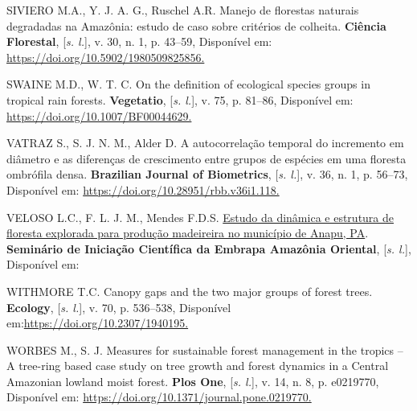 \documentclass[
]{article}
\newlength{\cslhangindent}
\newlength{\cslentryspacingunit} %
\newenvironment{CSLReferences}[2] %
 {%
  \setlength{\parindent}{0pt}
  \ifodd #1
  \let\oldpar\par
  \def\par{\hangindent=\cslhangindent\oldpar}
  \fi
  \setlength{\parskip}{#2\cslentryspacingunit}
 }%
 {}
\begin{document}
\begin{CSLReferences}{0}{1}
\leavevmode{}%
SIVIERO M.A., Y. J. A. G., Ruschel A.R. Manejo de florestas naturais
degradadas na Amazônia: estudo de caso sobre critérios de colheita.
\textbf{Ciência Florestal}, {[}\emph{s. l.}{]}, v. 30, n. 1, p. 43--59,
Disponível em:
\href{https://doi.org/10.5902/1980509825856}{https://doi.org/10.5902/1980509825856.
}

\leavevmode{}%
SWAINE M.D., W. T. C. On the definition of ecological species groups in
tropical rain forests. \textbf{Vegetatio}, {[}\emph{s. l.}{]}, v. 75, p.
81--86, Disponível em:
\href{https://doi.org/10.1007/BF00044629}{https://doi.org/10.1007/BF00044629.
}

\leavevmode{}%
VATRAZ S., S. J. N. M., Alder D. A autocorrelação temporal do incremento
em diâmetro e as diferenças de crescimento entre grupos de espécies em
uma floresta ombrófila densa. \textbf{Brazilian Journal of Biometrics},
{[}\emph{s. l.}{]}, v. 36, n. 1, p. 56--73, Disponível em:
\href{https://doi.org/10.28951/rbb.v36i1.118}{https://doi.org/10.28951/rbb.v36i1.118.
}

\leavevmode{}%
VELOSO L.C., F. L. J. M., Mendes F.D.S. \href{}{Estudo da dinâmica e
estrutura de floresta explorada para produção madeireira no município de
Anapu, PA}. \textbf{Seminário de Iniciação Científica da Embrapa
Amazônia Oriental}, {[}\emph{s. l.}{]}, Disponível em:

\leavevmode{}%
WITHMORE T.C. Canopy gaps and the two major groups of forest trees.
\textbf{Ecology}, {[}\emph{s. l.}{]}, v. 70, p. 536--538, Disponível
em:\href{\%20https://doi.org/10.2307/1940195}{https://doi.org/10.2307/1940195.
}

\leavevmode{}%
WORBES M., S. J. Measures for sustainable forest management in the
tropics -- A tree-ring based case study on tree growth and forest
dynamics in a Central Amazonian lowland moist forest. \textbf{Plos One},
{[}\emph{s. l.}{]}, v. 14, n. 8, p. e0219770, Disponível em:
\href{https://doi.org/10.1371/journal.pone.0219770}{https://doi.org/10.1371/journal.pone.0219770.
}

\end{CSLReferences}
\end{document}
